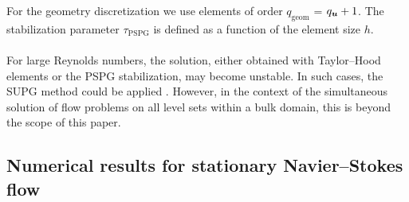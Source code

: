 \documentclass[12pt, twoside, english]{article}
\numberwithin{equation}{section}
\newcommand{\vek}[1]{\mathchoice{\displaystyle\boldsymbol#1}
{\textstyle\boldsymbol#1}{\scriptstyle\boldsymbol#1}
{\scriptscriptstyle\boldsymbol#1}}
\begin{document}
For the geometry discretization we use elements of order $q_{\mathrm{geom}}$ = $q_{\vek{u}}+1$. The stabilization parameter $\tau_{\mathrm{PSPG}}$ is defined as a function of the element size $h$.\\
\\
For large Reynolds numbers, the solution, either obtained with Taylor--Hood elements or the PSPG stabilization, may become unstable. In such cases, the SUPG method could be applied \cite{John_2016a,Tezduyar_2003a,Hughes_1979a,Brooks_1982a}. However, in the context of the simultaneous solution of flow problems on all level sets within a bulk domain, this is beyond the scope of this paper.

\subsection{Numerical results for stationary Navier--Stokes flow}\label{subsec:StNSEQ-NumRes}
\end{document}
